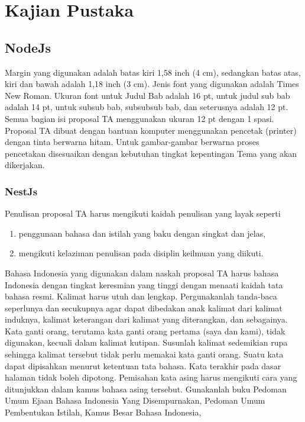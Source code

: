 \chapter{Kajian Pustaka}
 
\section{NodeJs}
Margin yang digunakan adalah batas kiri 1,58 inch (4 cm), sedangkan batas atas, kiri dan bawah adalah 1,18 inch (3 cm). Jenis font yang digunakan adalah Times New Roman. Ukuran font untuk Judul Bab adalah 16 pt, untuk judul sub bab adalah 14 pt, untuk subsub bab, subsubsub bab, dan seterusnya adalah 12 pt. Semua bagian isi proposal TA menggunakan ukuran 12 pt dengan 1 spasi. 
Proposal TA dibuat dengan bantuan komputer menggunakan pencetak (printer) dengan tinta berwarna hitam. Untuk gambar-gambar berwarna proses pencetakan disesuaikan dengan kebutuhan tingkat kepentingan Tema yang akan dikerjakan. 

\subsection{NestJs}

Penulisan proposal TA harus mengikuti kaidah penulisan yang layak seperti 
\begin{enumerate}
    \item penggunaan bahasa dan istilah yang baku dengan singkat dan jelas,
    \item mengikuti kelaziman penulisan pada disiplin keilmuan yang diikuti.
\end{enumerate}
Bahasa Indonesia yang digunakan dalam naskah proposal TA harus bahasa Indonesia dengan tingkat keresmian yang tinggi dengan menaati kaidah tata bahasa resmi. Kalimat harus utuh dan lengkap. Pergunakanlah tanda-baca seperlunya dan secukupnya agar dapat dibedakan anak kalimat dari kalimat induknya, kalimat keterangan dari kalimat yang diterangkan, dan sebagainya. 
Kata ganti orang, terutama kata ganti orang pertama (saya dan kami), tidak digunakan, kecuali dalam kalimat kutipan. Susunlah kalimat sedemikian rupa sehingga kalimat tersebut tidak perlu memakai kata ganti orang. Suatu kata dapat dipisahkan menurut ketentuan tata bahasa. Kata terakhir pada dasar halaman tidak boleh dipotong. Pemisahan kata asing harus mengikuti cara yang ditunjukkan dalam kamus bahasa asing tersebut. Gunakanlah buku Pedoman Umum Ejaan Bahasa Indonesia Yang Disempurnakan, Pedoman Umum Pembentukan Istilah, Kamus Besar Bahasa Indonesia, 



